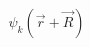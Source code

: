 \documentclass[preview]{standalone}
\begin{document}
\begin{align*}
\psi_k(\vec{r}+\vec{R})
\end{align*}
\end{document}
